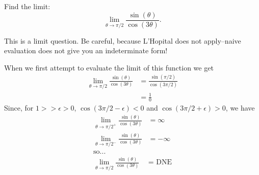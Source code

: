 \documentclass{ximera}
\author{Emma Smith Zbarsky}
\begin{document}
\begin{exercise}

Find the limit:
\[\lim_{\theta \to \pi/2} \frac{\sin(\theta)}{\cos(3\theta)}.\]


\begin{hint}
This is a limit question. Be careful, because L'Hopital does not
apply--naive evaluation does not give you an indeterminate form!
\end{hint}


\begin{hint}
When we first attempt to evaluate the limit of this function we get
\begin{align*}
\lim_{\theta \to \pi/2} \frac{\sin(\theta)}{\cos(3\theta)} &= \frac{\sin(\pi/2)}{\cos(3\pi/2)} \\
&= \frac{1}{0}
\end{align*} Since, for $1 > > \epsilon > 0$,
$\cos(3\pi/2-\epsilon) < 0$ and $\cos(3\pi/2+\epsilon) > 0$, we have
\begin{align*}
\lim_{\theta \to \pi/2^+} \frac{\sin(\theta)}{\cos(3\theta)} &= \infty \\
\lim_{\theta \to \pi/2^-} \frac{\sin(\theta)}{\cos(3\theta)} &= -\infty \\
\mbox{so...} & \\
\lim_{\theta \to \pi/2} \frac{\sin(\theta)}{\cos(3\theta)} &= \mbox{ DNE} \end{align*}
\end{hint}


\begin{multipleChoice}
\choice{$-\infty$}
\choice{$\infty$}
\end{multipleChoice}

\end{exercise}
\end{document}
